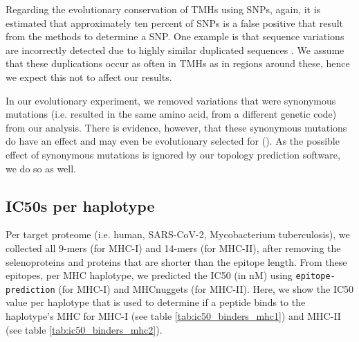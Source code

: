
Regarding the evolutionary conservation of TMHs using SNPs,
again, it is estimated that approximately ten percent
of SNPs is a false positive that result from the methods to determine
a SNP. One example is that sequence variations are incorrectly
detected due to highly similar duplicated sequences \cite{musumeci2010single}.
We assume that these duplications occur as often in TMHs as in
regions around these, hence we expect this not to affect our results.

%
In our evolutionary experiment, 
we removed variations that were synonymous mutations (i.e.
resulted in the same amino acid, from a different genetic code) 
from our analysis.
There is evidence, however, that these synonymous mutations
do have an effect and may even be evolutionary selected 
for (\cite{hunt2009silent}).
As the possible effect of synonymous mutations is ignored by our
topology prediction software, we do so as well.

\subsection{IC50s per haplotype}
\label{subsec:ic50s_per_haplotype}

Per target proteome (i.e. human, SARS-CoV-2, Mycobacterium tuberculosis),
we collected all 9-mers (for MHC-I) and 14-mers (for MHC-II),
after removing the selenoproteins and proteins that are shorter
than the epitope length.
From these epitopes, per MHC haplotype,
we predicted the IC50 (in nM) using \verb;epitope-prediction; (for MHC-I)
and MHCnuggets (for MHC-II). 
Here, we show the IC50 value per haplotype that
is used to determine if a peptide binds to the haplotype's MHC
for MHC-I (see table \ref{tab:ic50_binders_mhc1}) and 
MHC-II (see table \ref{tab:ic50_binders_mhc2}).





